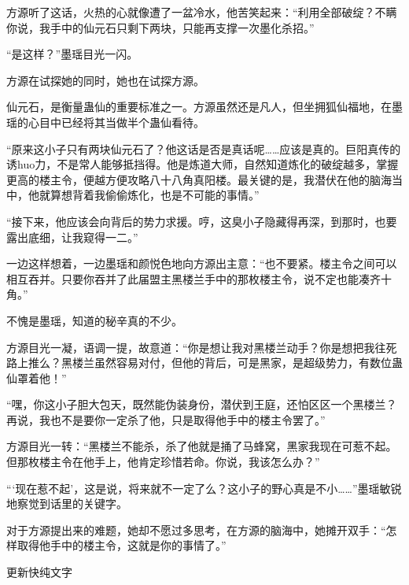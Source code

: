 \begin{this_body}
方源听了这话，火热的心就像遭了一盆冷水，他苦笑起来：“利用全部破绽？不瞒你说，我手中的仙元石只剩下两块，只能再支撑一次墨化杀招。”

“是这样？”墨瑶目光一闪。

方源在试探她的同时，她也在试探方源。

仙元石，是衡量蛊仙的重要标准之一。方源虽然还是凡人，但坐拥狐仙福地，在墨瑶的心目中已经将其当做半个蛊仙看待。

“原来这小子只有两块仙元石了？他这话是否是真话呢……应该是真的。巨阳真传的诱huo力，不是常人能够抵挡得。他是炼道大师，自然知道炼化的破绽越多，掌握更高的楼主令，便越方便攻略八十八角真阳楼。最关键的是，我潜伏在他的脑海当中，他就算想背着我偷偷炼化，也是不可能的事情。”

“接下来，他应该会向背后的势力求援。哼，这臭小子隐藏得再深，到那时，也要露出底细，让我窥得一二。”

一边这样想着，一边墨瑶和颜悦色地向方源出主意：“也不要紧。楼主令之间可以相互吞并。只要你吞并了此届盟主黑楼兰手中的那枚楼主令，说不定也能凑齐十角。”

不愧是墨瑶，知道的秘辛真的不少。

方源目光一凝，语调一提，故意道：“你是想让我对黑楼兰动手？你是想把我往死路上推么？黑楼兰虽然容易对付，但他的背后，可是黑家，是超级势力，有数位蛊仙罩着他！”

“嘿，你这小子胆大包天，既然能伪装身份，潜伏到王庭，还怕区区一个黑楼兰？再说，我也不是要你一定杀了他，只是取得他手中的楼主令罢了。”

方源目光一转：“黑楼兰不能杀，杀了他就是捅了马蜂窝，黑家我现在可惹不起。但那枚楼主令在他手上，他肯定珍惜若命。你说，我该怎么办？”

“‘现在惹不起’，这是说，将来就不一定了么？这小子的野心真是不小……”墨瑶敏锐地察觉到话里的关键字。

对于方源提出来的难题，她却不愿过多思考，在方源的脑海中，她摊开双手：“怎样取得他手中的楼主令，这就是你的事情了。”

更新快纯文字

\end{this_body}


